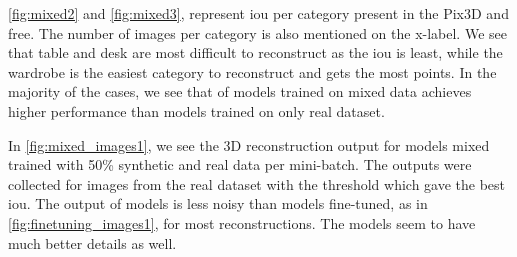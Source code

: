 
\autoref{fig:mixed2} and \autoref{fig:mixed3}, represent \gls{iou} per category present in the Pix3D and \gls{free}.
The number of images per category is also mentioned on the x-label.
We see that table and desk are most difficult to reconstruct as the \gls{iou} is least, while the wardrobe is the easiest category to reconstruct and gets the most points.
In the majority of the cases, we see that  of models trained on mixed data achieves higher performance than models trained on only real dataset.

In \autoref{fig:mixed_images1}, we see the 3D reconstruction output for models mixed trained with 50\% synthetic and real data per mini-batch.
The outputs were collected for images from the real dataset with the threshold which gave the best \gls{iou}.
The output of models is less noisy than models fine-tuned, as in \autoref{fig:finetuning_images1}, for most reconstructions.
The models seem to have much better details as well.


